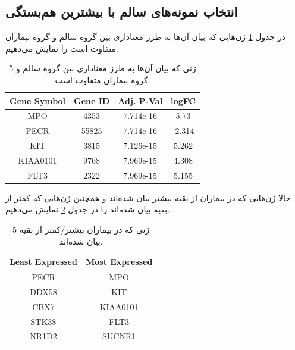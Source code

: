 \documentclass{article}
\begin{document}
\subsection{انتخاب نمونه‌های سالم با بیشترین هم‌بستگی}
در جدول \ref{tab:genes-2} ژن‌هایی که بیان آن‌ها به طرز معناداری بین گروه سالم و گروه بیماران متفاوت است را نمایش می‌دهیم.

\begin{table}[h!]
	\begin{latin}
		\begin{center}
			\begin{tabular}{@{}cccc@{}}
				\toprule
				Gene Symbol & Gene ID & Adj. P-Val & logFC  \\ \midrule
				MPO      & 4353  & 7.714e-16 & 5.73  \\
				PECR     & 55825 & 7.714e-16 & -2.314  \\
				KIT      & 3815  & 7.126e-15 & 5.262 \\
				KIAA0101 & 9768  & 7.969e-15 & 4.308 \\
				FLT3     & 2322  & 7.969e-15 & 5.155 \\ \bottomrule
			\end{tabular}
		\end{center}
	\end{latin}
	\caption{5 ژنی که بیان آن‌ها به طرز معناداری بین گروه سالم و گروه بیماران متفاوت است.}
	\label{tab:genes-2}
\end{table}

حالا ژن‌هایی که در بیماران از بقیه بیشتر بیان شده‌اند و همچنین ژن‌هایی که کمتر از بقیه بیان شده‌اند را در جدول \ref{tab:up-down-2} نمایش می‌دهیم.

\begin{table}[h!]
	\begin{latin}
		\begin{center}
			\begin{tabular}{@{}cc@{}}
				\toprule
				Least Expressed & Most Expressed \\ \midrule
				PECR           & MPO             \\
				DDX58          & KIT            \\
				CBX7           & KIAA0101        \\
				STK38          & FLT3           \\
				NR1D2          & SUCNR1          \\ \bottomrule
			\end{tabular}
		\end{center}
	\end{latin}
	\caption{5 ژنی که در بیماران بیشتر/کمتر از بقیه بیان شده‌اند.}
	\label{tab:up-down-2}
\end{table}
\end{document}
